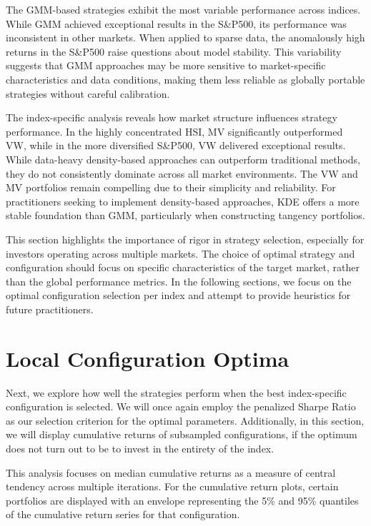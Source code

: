The GMM-based strategies exhibit the most variable performance across indices. While GMM achieved exceptional results in the S\&P500, its performance was inconsistent in other markets. When applied to sparse data, the anomalously high returns in the S\&P500 raise questions about model stability. This variability suggests that GMM approaches may be more sensitive to market-specific characteristics and data conditions, making them less reliable as globally portable strategies without careful calibration.

The index-specific analysis reveals how market structure influences strategy performance. In the highly concentrated HSI, MV significantly outperformed VW, while in the more diversified S\&P500, VW delivered exceptional results. While data-heavy density-based approaches can outperform traditional methods, they do not consistently dominate across all market environments. The VW and MV portfolios remain compelling due to their simplicity and reliability. For practitioners seeking to implement density-based approaches, KDE offers a more stable foundation than GMM, particularly when constructing tangency portfolios.

This section highlights the importance of rigor in strategy selection, especially for investors operating across multiple markets. The choice of optimal strategy and configuration should focus on specific characteristics of the target market, rather than the global performance metrics. In the following sections, we focus on the optimal configuration selection per index and attempt to provide heuristics for future practitioners.

\section{Local Configuration Optima}
\label{sec:localoptima}

Next, we explore how well the strategies perform when the best index-specific configuration is selected. We will once again employ the penalized Sharpe Ratio as our selection criterion for the optimal parameters. Additionally, in this section, we will display cumulative returns of subsampled configurations, if the optimum does not turn out to be to invest in the entirety of the index.

This analysis focuses on median cumulative returns as a measure of central tendency across multiple iterations. For the cumulative return plots, certain portfolios are displayed with an envelope representing the 5\% and 95\% quantiles of the cumulative return series for that configuration.

